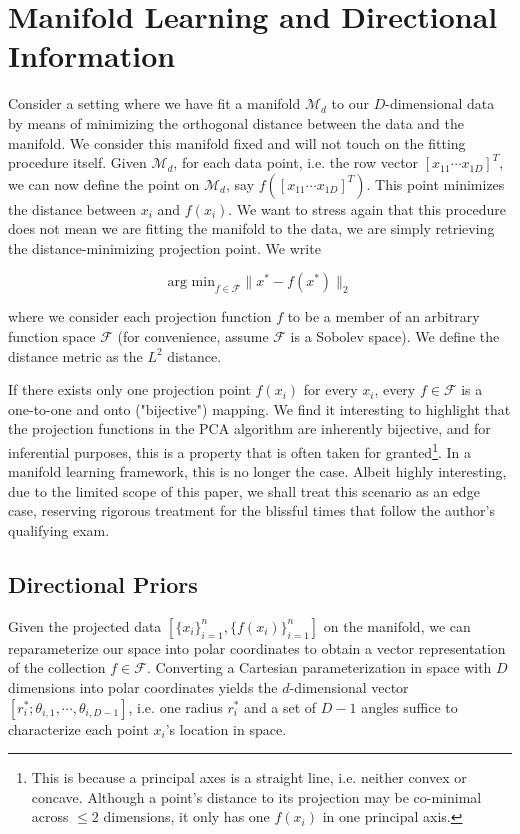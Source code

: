 \documentclass[twoside,11pt]{article}
\begin{document}
\section{Manifold Learning and Directional Information}\label{sc:background}

Consider a setting where we have fit a manifold $\mathcal{M}_d$ to our $D$-dimensional data by means of minimizing the orthogonal distance between the data and the manifold. We consider this manifold fixed and will not touch on the fitting procedure itself. Given $\mathcal{M}_d$, for each data point, i.e. the row vector $[x_{11} \cdots x_{1D}]^T$, we can now define the point on $\mathcal{M}_d$, say $f\left(\left[x_{11} \cdots x_{1D}\right]^T\right)$. This point minimizes the distance between $x_i$ and $f(x_i)$. We want to stress again that this procedure does not mean we are fitting the manifold to the data, we are simply retrieving the distance-minimizing projection point. We write 

$$
\text{arg~min}_{f \in \mathcal{F}} \|x^* - f(x^*)\|_2
$$

where we consider each projection function $f$ to be a member of an arbitrary function space $\mathcal{F}$ (for convenience, assume $\mathcal{F}$ is a Sobolev space). We define the distance metric as the $L^2$ distance. 

If there exists only one projection point $f(x_i)$ for every $x_i$, every $f \in \mathcal{F}$ is a one-to-one and onto ("bijective") mapping. We find it interesting to highlight that the projection functions in the PCA algorithm are inherently bijective, and for inferential purposes, this is a property that is often taken for granted\footnote{This is because a principal axes is a straight line, i.e. neither convex or concave. Although a point's distance to its projection may be co-minimal across $\leq 2$ dimensions, it only has one $f(x_i)$ in one principal axis.}. In a manifold learning framework, this is no longer the case. Albeit highly interesting, due to the limited scope of this paper, we shall treat this scenario as an edge case, reserving rigorous treatment for the blissful times that follow the author's qualifying exam. 

\subsection{Directional Priors}\label{sc:directional-priors}

Given the projected data $[\{x_i\}_{i=1}^n, \{f(x_i)\}_{i=1}^n]$ on the manifold, we can reparameterize our space into polar coordinates to obtain a vector representation of the collection $f \in \mathcal{F}$. Converting a Cartesian parameterization in space with $D$ dimensions into polar coordinates yields the $d$-dimensional vector $[r_i^*; \theta_{i, 1}, \cdots, \theta_{i, D-1}]$, i.e. one radius $r_i^*$ and a set of $D-1$ angles suffice to characterize each point $x_i$'s location in space. 
\end{document}
